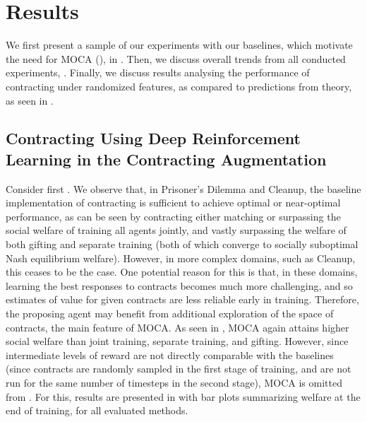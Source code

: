 \documentclass[referee,sn-basic]{sn-jnl}
\theoremstyle{thmstyleone}%
\theoremstyle{thmstyletwo}%
\theoremstyle{thmstylethree}%
\begin{document}
\section{Results}\label{sec:experiments}
We first present a sample of our experiments with our baselines, which motivate the need for MOCA (), in . Then, we discuss overall trends from all conducted experiments, . Finally, we discuss results analysing the performance of contracting under randomized features, as compared to predictions from theory, as seen in .

\subsection{Contracting Using Deep Reinforcement Learning in the Contracting Augmentation} Consider first . We observe that, in Prisoner's Dilemma and Cleanup, the baseline implementation of contracting is sufficient to achieve optimal or near-optimal performance, as can be seen by contracting either matching or surpassing the social welfare of training all agents jointly, and vastly surpassing the welfare of both gifting and separate training (both of which converge to socially suboptimal Nash equilibrium welfare). However, in more complex domains, such as Cleanup, this ceases to be the case. One potential reason for this is that, in these domains, learning the best responses to contracts becomes much more challenging, and so estimates of value for given contracts are less reliable early in training. Therefore, the proposing agent may benefit from additional exploration of the space of contracts, the main feature of MOCA. As seen in , MOCA again attains higher social welfare than joint training, separate training, and gifting. However, since intermediate levels of reward are not directly comparable with the baselines (since contracts are randomly sampled in the first stage of training, and are not run for the same number of timesteps in the second stage), MOCA is omitted from . For this, results are presented in  with bar plots summarizing welfare at the end of training, for all evaluated methods.
\end{document}
